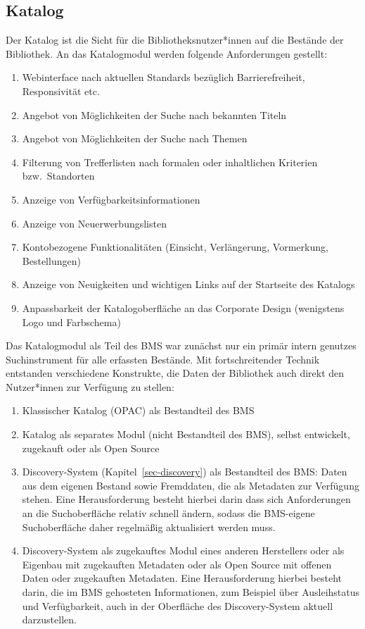 \documentclass[
  11pt,
  letterpaper,
  DIV=11,
  twoside]{scrreprt}
\begin{document}
\subsection{Katalog}\label{katalog-prozess}

Der Katalog ist die Sicht für die Bibliotheksnutzer*innen auf die
Bestände der Bibliothek. An das Katalogmodul werden folgende
Anforderungen gestellt:

\begin{enumerate}
\def\labelenumi{\arabic{enumi}.}
\item
  Webinterface nach aktuellen Standards bezüglich Barrierefreiheit,
  Responsivität etc.
\item
  Angebot von Möglichkeiten der Suche nach bekannten Titeln
\item
  Angebot von Möglichkeiten der Suche nach Themen
\item
  Filterung von Trefferlisten nach formalen oder inhaltlichen Kriterien
  bzw.~Standorten
\item
  Anzeige von Verfügbarkeitsinformationen
\item
  Anzeige von Neuerwerbungslisten
\item
  Kontobezogene Funktionalitäten (Einsicht, Verlängerung, Vormerkung,
  Bestellungen)
\item
  Anzeige von Neuigkeiten und wichtigen Links auf der Startseite des
  Katalogs
\item
  Anpassbarkeit der Katalogoberfläche an das Corporate Design
  (wenigstens Logo und Farbschema)
\end{enumerate}

Das Katalogmodul als Teil des BMS war zunächst nur ein primär intern
genutzes Suchinstrument für alle erfassten Bestände. Mit
fortschreitender Technik entstanden verschiedene Konstrukte, die Daten
der Bibliothek auch direkt den Nutzer*innen zur Verfügung zu stellen:

\begin{enumerate}
\def\labelenumi{\arabic{enumi}.}
\item
  Klassischer Katalog (OPAC) als Bestandteil des BMS
\item
  Katalog als separates Modul (nicht Bestandteil des BMS), selbst
  entwickelt, zugekauft oder als Open Source
\item
  Discovery-System (Kapitel~\ref{sec-discovery}) als Bestandteil des
  BMS: Daten aus dem eigenen Bestand sowie Fremddaten, die als Metadaten
  zur Verfügung stehen. Eine Herausforderung besteht hierbei darin dass
  sich Anforderungen an die Suchoberfläche relativ schnell ändern,
  sodass die BMS-eigene Suchoberfläche daher regelmäßig aktualisiert
  werden muss.
\item
  Discovery-System als zugekauftes Modul eines anderen Herstellers oder
  als Eigenbau mit zugekauften Metadaten oder als Open Source mit
  offenen Daten oder zugekauften Metadaten. Eine Herausforderung hierbei
  besteht darin, die im BMS gehosteten Informationen, zum Beispiel über
  Ausleihstatus und Verfügbarkeit, auch in der Oberfläche des
  Discovery-System aktuell darzustellen.
\end{enumerate}
\end{document}
